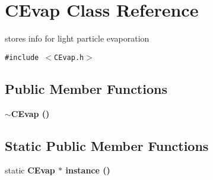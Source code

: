 \section{CEvap Class Reference}
\label{classCEvap}
stores info for light particle evaporation  


{\tt \#include $<$CEvap.h$>$}

\subsection*{Public Member Functions}
\begin{CompactItemize}
\item 
\bf{$\sim$CEvap} ()
\end{CompactItemize}
\subsection*{Static Public Member Functions}
\begin{CompactItemize}
\item 
static \bf{CEvap} $\ast$ \textbf{instance} ()\label{classCEvap_e449f192ce43cfd9d864628398e8d9ba}

\end{CompactItemize}
